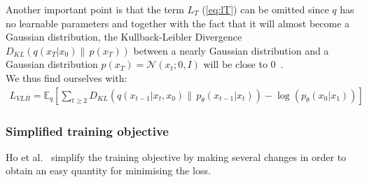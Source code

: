 \documentclass{article}
\numberwithin{equation}{section}
\numberwithin{figure}{section}
\begin{document}
Another important point is that the term $L_T$ (\ref{eq:lT}) can be omitted since $q$ has no learnable parameters and together with the fact that it will almost become a Gaussian distribution, the Kullback-Leibler Divergence $D_{KL}\left(q\left(x_T | x_0\right) \| \, p\left(x_T\right)\right)$ between a nearly Gaussian distribution and a Gaussian distribution $p\left(x_T\right) = \mathcal{N}\left(x_t; 0, I\right)$ will be close to 0~\cite{ho2020denoising}. \\
We thus find ourselves with:
\begin{gather}
  L_{VLB} = \mathbb{E}_q \left[ \sum_{t \geq 2} D_{KL}\left(q\left(x_{t-1} | x_t, x_0\right) \| \, p_{\theta}\left(x_{t-1} | x_t\right)\right) - \log\left(p_{\theta}\left(x_0 | x_1\right)\right) \right]
\end{gather}

\subsubsection{Simplified training objective}

Ho et al.~\cite{ho2020denoising} simplify the training objective by making several changes in order to obtain an easy quantity for minimising the loss. 
\end{document}

